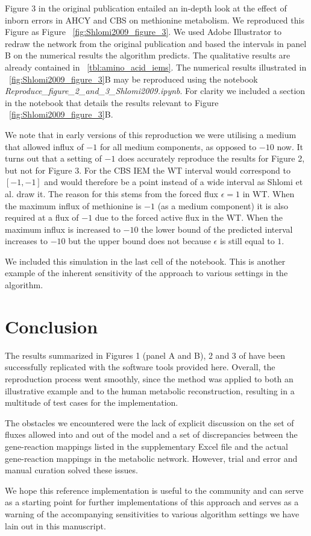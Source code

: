 \documentclass[10pt,a4paper,onecolumn]{article}
\begin{document}
Figure 3 in the original publication entailed an in-depth look at the
effect of inborn errors in AHCY and CBS on methionine metabolism. We
reproduced this Figure as Figure ~\ref{fig:Shlomi2009_figure_3}. We used
Adobe Illustrator to redraw the network from the original publication
and based the intervals in panel B on the numerical results the
algorithm predicts. The qualitative results are already contained in
~\ref{tbl:amino_acid_iems}. The numerical results illustrated in
~\ref{fig:Shlomi2009_figure_3}B may be reproduced using the notebook
\emph{Reproduce\_figure\_2\_and\_3\_Shlomi2009.ipynb}. For clarity we
included a section in the notebook that details the results relevant to
Figure ~\ref{fig:Shlomi2009_figure_3}B.

We note that in early versions of this reproduction we were utilising a
medium that allowed influx of \(-1\) for all medium components, as
opposed to \(-10\) now. It turns out that a setting of \(-1\) does
accurately reproduce the results for Figure 2, but not for Figure 3. For
the CBS IEM the WT interval would correspond to \([-1,-1]\) and would
therefore be a point instead of a wide interval as Shlomi et al. draw
it. The reason for this stems from the forced flux \(\epsilon = 1\) in
WT. When the maximum influx of methionine is \(-1\) (as a medium
component) it is also required at a flux of \(-1\) due to the forced
active flux in the WT. When the maximum influx is increased to \(-10\)
the lower bound of the predicted interval increases to \(-10\) but the
upper bound does not because \(\epsilon\) is still equal to \(1\).

We included this simulation in the last cell of the notebook. This is
another example of the inherent sensitivity of the approach to various
settings in the algorithm.

\section{Conclusion}\label{conclusion}

The results summarized in Figures 1 (panel A and B), 2 and 3 of
\autocite{Shlomi2009} have been successfully replicated with the
software tools provided here. Overall, the reproduction process went
smoothly, since the method was applied to both an illustrative example
and to the human metabolic reconstruction, resulting in a multitude of
test cases for the implementation.

The obstacles we encountered were the lack of explicit discussion on the
set of fluxes allowed into and out of the model and a set of
discrepancies between the gene-reaction mappings listed in the
supplementary Excel file and the actual gene-reaction mappings in the
metabolic network. However, trial and error and manual curation solved
these issues.

We hope this reference implementation is useful to the community and can
serve as a starting point for further implementations of this approach
and serves as a warning of the accompanying sensitivities to various
algorithm settings we have lain out in this manuscript.

{\sffamily \small
  \printbibliography[title=References]
}
\end{document}
